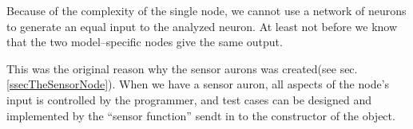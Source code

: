Because of the complexity of the single node, we cannot use a network of neurons to generate an equal input to the analyzed neuron. 
At least not before we know that the two model--specific nodes give the same output. %

%
%
%

This was the original reason why the sensor aurons was created(see sec. \ref{ssecTheSensorNode}).
When we have a sensor auron, all aspects of the node's input is controlled by the programmer, and test cases can be designed and implemented by the ``sensor function'' sendt in to the constructor of the object.


